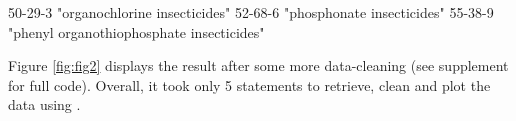 \documentclass[article, shortnames]{jss}\usepackage[]{graphicx}\usepackage[]{color}
\providecommand{\DIFaddbegin}{} %
\providecommand{\DIFaddend}{} %
\providecommand{\DIFdelbegin}{} %
\providecommand{\DIFdelend}{} %
\begin{document}
\DIFdelbegin %
\DIFdelend \DIFaddbegin \begin{CodeChunk}
\begin{CodeOutput}
                                  50-29-3 
            "organochlorine insecticides" 
                                  52-68-6 
               "phosphonate insecticides" 
                                  55-38-9 
"phenyl organothiophosphate insecticides" 
\end{CodeOutput}
\end{CodeChunk}
\DIFaddend 

Figure \ref{fig:fig2} displays the result after some more data-cleaning (see supplement for full code).
Overall, it took only 5  statements to retrieve, clean and plot the data using  \citep{ggplot2}.
\end{document}
